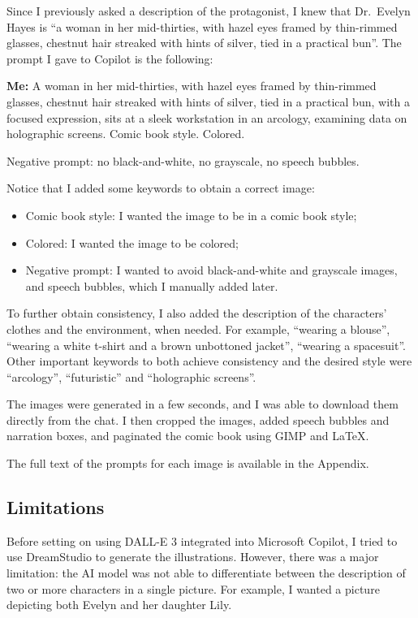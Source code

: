 \documentclass[a4paper,11pt]{article}
\newenvironment{shadedquotation3}
    {\colorlet{shadecolor}{Purple!15}\begin{shaded*}
    \quoting[leftmargin=1cm, rightmargin=1cm, vskip=0pt]
    }
    {\endquoting
    \end{shaded*}
}
\begin{document}
Since I previously asked a description of the protagonist, I knew that Dr.~Evelyn Hayes is ``a woman in her mid-thirties, with hazel eyes framed by thin-rimmed glasses, chestnut hair streaked with hints of silver, tied in a practical bun''. The prompt I gave to Copilot is the following:
\begin{shadedquotation3}
    \textbf{Me:} A woman in her mid-thirties, with hazel eyes framed by thin-rimmed glasses, chestnut hair streaked with hints of silver, tied in a practical bun, with a focused expression, sits at a sleek workstation in an arcology, examining data on holographic screens. Comic book style. Colored.\smallskip

    \noindent Negative prompt: no black-and-white, no grayscale, no speech bubbles.
\end{shadedquotation3}
Notice that I added some keywords to obtain a correct image:
\begin{itemize}
    \item Comic book style: I wanted the image to be in a comic book style;
    \item Colored: I wanted the image to be colored;
    \item Negative prompt: I wanted to avoid black-and-white and grayscale images, and speech bubbles, which I manually added later.
\end{itemize}
To further obtain consistency, I also added the description of the characters' clothes and the environment, when needed. For example, ``wearing a blouse'', ``wearing a white t-shirt and a brown unbottoned jacket'', ``wearing a spacesuit''. Other important keywords to both achieve consistency and the desired style were ``arcology'', ``futuristic'' and ``holographic screens''.

The images were generated in a few seconds, and I was able to download them directly from the chat. I then cropped the images, added speech bubbles and narration boxes, and paginated the comic book using GIMP and \LaTeX.\medskip

The full text of the prompts for each image is available in the Appendix.

\subsection{Limitations}
Before setting on using DALL-E 3 integrated into Microsoft Copilot, I tried to use DreamStudio to generate the illustrations. However, there was a major limitation: the AI model was not able to differentiate between the description of two or more characters in a single picture. For example, I wanted a picture depicting both Evelyn and her daughter Lily.
\end{document}
